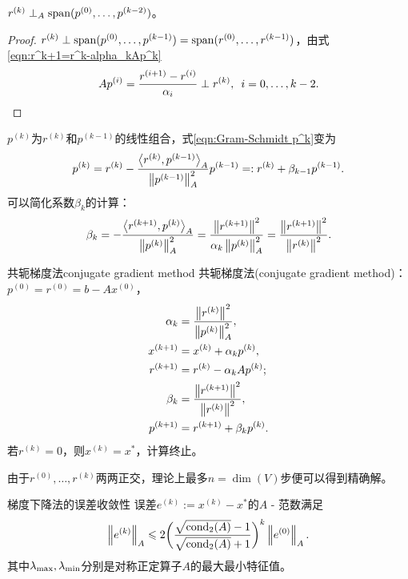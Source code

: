 \begin{theorem}
    {}{}
    $r^{(k)}\perp_A\operatorname{span}(p^{(0)},\ldots,p^{(k-2)})$。
\end{theorem}

\begin{proof}
    $r^{(k)}\perp\operatorname{span}(p^{(0)},\ldots,p^{(k-1)})=\operatorname{span}(r^{(0)},\ldots,r^{(k-1)})$，由式\eqref{eqn:r^k+1=r^k-alpha_kAp^k}
    \[
        Ap^{(i)}=\frac{r^{(i+1)}-r^{(i)}}{\alpha_i}\perp r^{(k)},\enspace i=0,\ldots,k-2.
        \qedhere
    \]
\end{proof}

\begin{corollary}
    $p^{(k)}$为$r^{(k)}$和$p^{(k-1)}$的线性组合，式\eqref{eqn:Gram-Schmidt p^k}变为
    \[
        p^{(k)}=r^{(k)}-\frac{\left\langle r^{(k)},p^{(k-1)}\right\rangle_A}{\left\lVert p^{(k-1)}\right\rVert_A^2}p^{(k-1)}=:r^{(k)}+\beta_{k-1}p^{(k-1)}.
    \]
    可以简化系数$\beta_k$的计算：
    \[
        \beta_k=-\frac{\left\langle r^{(k+1)},p^{(k)}\right\rangle_A}{\left\lVert p^{(k)}\right\rVert_A^2}=\frac{\left\lVert r^{(k+1)}\right\rVert^2}{\alpha_k\left\lVert p^{(k)}\right\rVert_A^2}=\frac{\left\lVert r^{(k+1)}\right\rVert^2}{\left\lVert r^{(k)}\right\rVert^2}.
    \]
\end{corollary}

\begin{theorem}
    {共轭梯度法}{conjugate gradient method}
    共轭梯度法(conjugate gradient method)：$p^{(0)}=r^{(0)}=b-Ax^{(0)}$，
    \begin{subequations}
        \begin{align}
            \alpha_k&=\frac{\left\lVert r^{(k)}\right\rVert^2}{\left\lVert p^{(k)}\right\rVert_A^2},\\
            x^{(k+1)}&=x^{(k)}+\alpha_kp^{(k)},\\
            r^{(k+1)}&=r^{(k)}-\alpha_kAp^{(k)};\\
            \beta_k&=\frac{\left\lVert r^{(k+1)}\right\rVert^2}{\left\lVert r^{(k)}\right\rVert^2},\\
            p^{(k+1)}&=r^{(k+1)}+\beta_kp^{(k)}.
        \end{align}
    \end{subequations}
    若$r^{(k)}=0$，则$x^{(k)}=x^*$，计算终止。
\end{theorem}

\begin{corollary}
    由于$r^{(0)},\ldots,r^{(k)}$两两正交，理论上最多$n=\dim(V)$步便可以得到精确解。
\end{corollary}

\begin{theorem}
    {梯度下降法的误差收敛性}{}
    误差$e^{(k)}:=x^{(k)}-x^*$的$A$ - 范数满足
    \begin{equation}
        \label{eqn:CG e^k}
        \left\lVert e^{(k)}\right\rVert_A\leqslant 2\biggl(\frac{\sqrt{\operatorname{cond}_2(A)}-1}{\sqrt{\operatorname{cond}_2(A)}+1}\biggr)^k\left\lVert e^{(0)}\right\rVert_A.
    \end{equation}
    其中$\lambda_\mathrm{max},\lambda_\mathrm{min}$分别是对称正定算子$A$的最大最小特征值。
\end{theorem}

